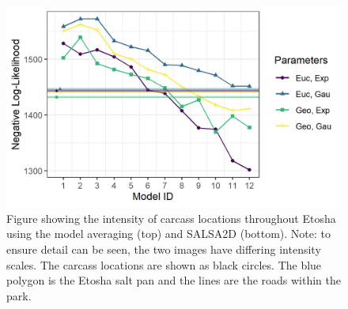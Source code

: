 \documentclass[letterpaper, 12pt]{interact}
\begin{document}
	
	\begin{figure}[!ht]
		\centering
		\includegraphics[width=0.7\linewidth]{images/Figure3.jpg}
		\caption{Figure showing the intensity of carcass locations throughout Etosha using the model averaging (top) and SALSA2D (bottom). Note: to ensure detail can be seen, the two images have differing intensity scales. The carcass locations are shown as black circles. The blue polygon is the Etosha salt pan and the lines are the roads within the park.}
		\label{fig:simmaps}
	\end{figure}
	
	
\end{document}
